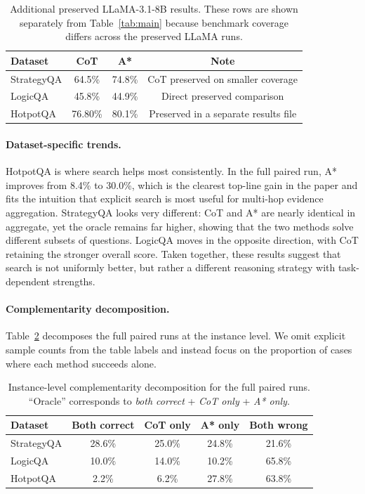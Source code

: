 \documentclass[11pt]{article}
\begin{document}
\begin{table}[t]
\centering

\small
\begin{tabular}{lccc}
\toprule
\textbf{Dataset} & \textbf{CoT} & \textbf{A*} & \textbf{Note} \\
\midrule
StrategyQA & 64.5\% & 74.8\% & CoT preserved on smaller coverage \\
LogicQA    & 45.8\% & 44.9\% & Direct preserved comparison \\
HotpotQA   & 76.80\%  & 80.1\% & Preserved in a separate results file \\
\bottomrule
\end{tabular}
\caption{Additional preserved LLaMA-3.1-8B results. These rows are shown separately from Table~\ref{tab:main} because benchmark coverage differs across the preserved LLaMA runs.}
\label{tab:llama_results}
\end{table}

\paragraph{Dataset-specific trends.} HotpotQA is where search helps most consistently. In the full paired run, A* improves from 8.4\% to 30.0\%, which is the clearest top-line gain in the paper and fits the intuition that explicit search is most useful for multi-hop evidence aggregation. StrategyQA looks very different: CoT and A* are nearly identical in aggregate, yet the oracle remains far higher, showing that the two methods solve different subsets of questions. LogicQA moves in the opposite direction, with CoT retaining the stronger overall score. Taken together, these results suggest that search is not uniformly better, but rather a different reasoning strategy with task-dependent strengths.

\paragraph{Complementarity decomposition.} Table~\ref{tab:complementarity} decomposes the full paired runs at the instance level. We omit explicit sample counts from the table labels and instead focus on the proportion of cases where each method succeeds alone.

\begin{table}[t]
\centering

\small
\begin{tabular}{lcccc}
\toprule
\textbf{Dataset} & \textbf{Both correct} & \textbf{CoT only} & \textbf{A* only} & \textbf{Both wrong} \\
\midrule
StrategyQA & 28.6\% & 25.0\% & 24.8\% & 21.6\% \\
LogicQA    & 10.0\% & 14.0\% & 10.2\% & 65.8\% \\
HotpotQA   & 2.2\%  & 6.2\%  & 27.8\% & 63.8\% \\
\bottomrule
\end{tabular}
\caption{Instance-level complementarity decomposition for the full paired runs. ``Oracle'' corresponds to \textit{both correct} + \textit{CoT only} + \textit{A* only}.}
\label{tab:complementarity}
\end{table}
\end{document}
